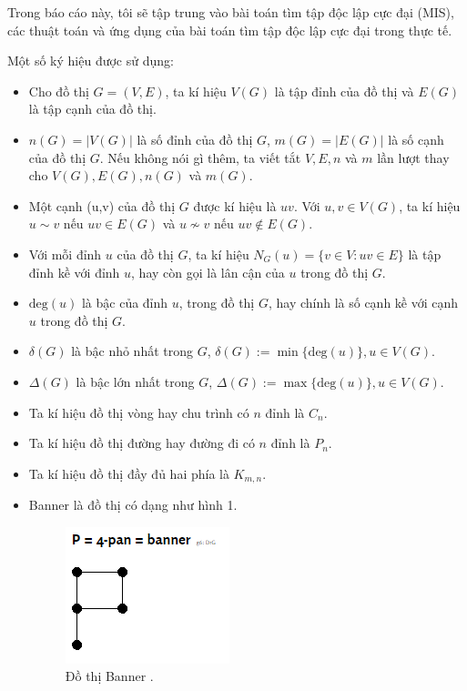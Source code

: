 \documentclass[14pt, oneside, a4paper, openany]{scrartcl}
\begin{document}
Trong báo cáo này, tôi sẽ tập trung vào bài toán tìm tập độc lập cực đại (MIS), các thuật toán và ứng dụng của bài toán tìm tập độc lập cực đại trong thực tế. 

Một số ký hiệu được sử dụng:
\begin{itemize}
	\item Cho đồ thị $G = (V,E)$, ta kí hiệu $V(G)$ là tập đỉnh của đồ thị và $E(G)$ là tập cạnh  của đồ thị.
	\item $n(G) = |V(G)|$ là số đỉnh của đồ thị $G$, $m(G) = |E(G)|$ là số cạnh của đồ thị $G$. Nếu không nói gì thêm, ta viết tắt $V, E, n$ và $m$ lần lượt thay cho $V(G), E(G), n(G)$ và $m(G)$.
	\item Một cạnh (u,v) của đồ thị $G$ được kí hiệu là $uv$. Với $u,v \in V(G)$, ta kí hiệu $u \sim v$ nếu $uv \in E(G)$ và $u \nsim v$ nếu $uv \not\in E(G)$.
	\item Với mỗi đỉnh $u$ của đồ thị $G$, ta kí hiệu $N_G(u) = \{v \in V: uv \in E\}$ là tập đỉnh kề với đỉnh $u$, hay còn gọi là lân cận  của $u$ trong đồ thị $G$.
	\item $\textrm{deg}(u)$ là bậc của đỉnh  $u$, trong đồ thị $G$, hay chính là số cạnh kề với cạnh $u$ trong đồ thị $G$.
	\item $\delta(G)$ là bậc nhỏ nhất  trong $G$, $\delta(G) := \min\{\textrm{deg}(u)\} , u \in V(G)$.
	\item $\Delta(G)$ là bậc lớn nhất  trong $G$, $\Delta(G) := \max\{\textrm{deg}(u)\} , u \in V(G)$.
	\item Ta kí hiệu đồ thị vòng  hay chu trình  có $n$ đỉnh là $C_n$.
	\item Ta kí hiệu đồ thị đường hay đường đi  có $n$ đỉnh là $P_n$.
	\item Ta kí hiệu đồ thị đầy đủ hai phía là $K_{m,n}$.
	\item \cite{graphclasses} Banner là đồ thị có dạng như hình 1.
	\begin{figure}[!h]
		\centering
		\includegraphics[scale=1]{figures/banner.png} 
		\caption[Đồ thị Banner]{Đồ thị Banner \cite{graphclasses}.}
	\end{figure}
\end{itemize}
\end{document}
